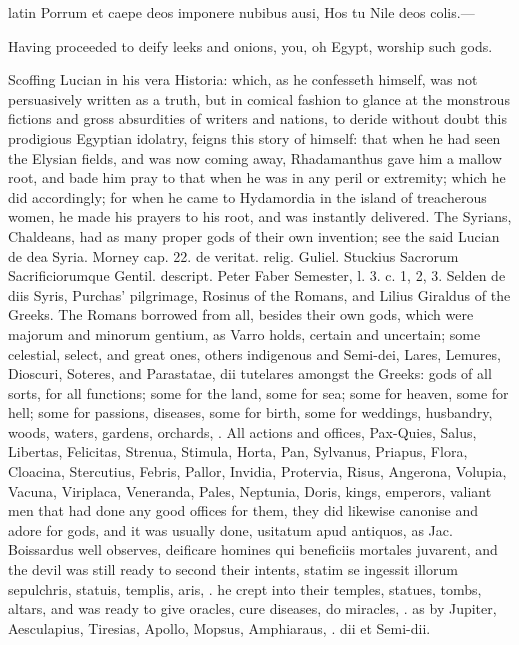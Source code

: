 {\begin{foreigndisplayquote}{latin}%
Porrum et caepe deos imponere nubibus ausi,
Hos tu Nile deos colis.---
\end{foreigndisplayquote}%
\translationrule%
\begin{displayquote}%
Having proceeded to deify leeks and onions, you, oh Egypt, worship such gods.
\end{displayquote}%

Scoffing Lucian in his vera Historia: which, as he confesseth
himself, was not persuasively written as a truth, but in comical
fashion to glance at the monstrous fictions and gross absurdities of
writers and nations, to deride without doubt this prodigious Egyptian
idolatry, feigns this story of himself: that when he had seen the
Elysian fields, and was now coming away, Rhadamanthus gave him a mallow
root, and bade him pray to that when he was in any peril or extremity;
which he did accordingly; for when he came to Hydamordia in the island
of treacherous women, he made his prayers to his root, and was
instantly delivered. The Syrians, Chaldeans, had as many proper gods of
their own invention; see the said Lucian de dea Syria. Morney cap. 22.
de veritat. relig. Guliel. Stuckius Sacrorum Sacrificiorumque
Gentil. descript. Peter Faber Semester, l. 3. c. 1, 2, 3. Selden de
diis Syris, Purchas' pilgrimage,  Rosinus of the Romans, and
Lilius Giraldus of the Greeks. The Romans borrowed from all, besides
their own gods, which were majorum and minorum gentium, as Varro holds,
certain and uncertain; some celestial, select, and great ones, others
indigenous and Semi-dei, Lares, Lemures, Dioscuri, Soteres, and
Parastatae, dii tutelares amongst the Greeks: gods of all sorts, for
all functions; some for the land, some for sea; some for heaven, some
for hell; some for passions, diseases, some for birth, some for
weddings, husbandry, woods, waters, gardens, orchards, \etc{}. All actions
and offices, Pax-Quies, Salus, Libertas, Felicitas, Strenua, Stimula,
Horta, Pan, Sylvanus, Priapus, Flora, Cloacina, Stercutius, Febris,
Pallor, Invidia, Protervia, Risus, Angerona, Volupia, Vacuna,
Viriplaca, Veneranda, Pales, Neptunia, Doris, kings, emperors, valiant
men that had done any good offices for them, they did likewise canonise
and adore for gods, and it was usually done, usitatum apud antiquos, as
Jac. Boissardus well observes, deificare homines qui beneficiis
mortales juvarent, and the devil was still ready to second their
intents, statim se ingessit illorum sepulchris, statuis, templis, aris,
\etc{}. he crept into their temples, statues, tombs, altars, and was ready
to give oracles, cure diseases, do miracles, \etc{}. as by Jupiter,
Aesculapius, Tiresias, Apollo, Mopsus, Amphiaraus, \etc{}. dii et Semi-dii.

}

